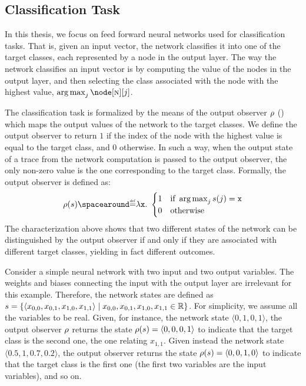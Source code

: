 \subsection{Classification Task}

In this thesis, we focus on feed forward neural networks used for classification tasks.
That is, given an input vector, the network classifies it into one of the target classes, each represented by a node in the output layer.
The way the network classifies an input vector is by computing the value of the nodes in the output layer, and then selecting the class associated with the node with the highest value, \ie{} $\argmax_{j} \node[\lastlayerindex][j]$.

The classification task is formalized by the means of the output observer $\rho$ () which maps the output values of the network to the target classes.
We define the output observer to return $1$ if the index of the node with the highest value is equal to the target class, and $0$ otherwise.
In such a way, when the output state of a trace from the network computation is passed to the output observer, the only non-zero value is the one corresponding to the target class. Formally, the output observer is defined as:
\begin{align*}
  \outputobs(\defstate) \DefeQ \lambda \defvariable.\spacer
  \begin{cases}
    1 & \text{if } \argmax_{j} \defstate(j) = \defvariable \\
    0 & \text{otherwise}
  \end{cases}
\end{align*}
The characterization above shows that two different states of the network can be distinguished by the output observer if and only if they are associated with different target classes, yielding in fact different outcomes.


\begin{example}
  Consider a simple neural network with two input and two output variables.
  The weights and biases connecting the input with the output layer are irrelevant for this example.
  Therefore, the network states are defined as $s = \{\langle x_{0, 0}, x_{0, 1}, x_{1, 0}, x_{1, 1} \rangle \mid x_{0, 0}, x_{0, 1}, x_{1, 0}, x_{1, 1} \in \mathbb{R}\}$. For simplicity, we assume all the variables to be real.
  Given, for instance, the network state $\langle 0, 1, 0, 1 \rangle$, the output observer $\rho$ returns the state $\rho(s) = \langle 0, 0, 0, 1 \rangle$ to indicate that the target class is the second one, \cf{} the one relating $x_{1, 1}$.
  Given instead the network state $\langle 0.5, 1, 0.7, 0.2 \rangle$, the output observer returns the state $\rho(s) = \langle 0, 0, 1, 0\rangle$ to indicate that the target class is the first one (the first two variables are the input variables), and so on.
\end{example}

